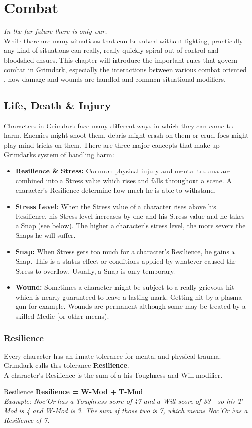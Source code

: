 \chapter{Combat}
\textit{In the far future there is only war.}\\
While there are many situations that can be solved without fighting, practically any kind of situations can really, really quickly spiral out of control and bloodshed ensues. 
This chapter will introduce the important rules that govern combat in Grimdark, especially the interactions between various combat oriented , how damage and wounds are handled and common situational modifiers.

\section{Life, Death \& Injury}
Characters in Grimdark face many different ways in which they can come to harm.
Enemies might shoot them, debris might crash on them or cruel foes might play mind tricks on them.
There are three major concepts that make up Grimdarks system of handling harm:
\begin{itemize}
	\item \textbf{Resilience \& Stress:} Common physical injury and mental trauma are combined into a Stress value which rises and falls throughout a scene. A character's Resilience determine how much he is able to withstand.
	\item \textbf{Stress Level:} When the Stress value of a character rises above his Resilience, his Stress level increases by one and his Stress value and he takes a Snap (see below). The higher a character's stress level, the more severe the Snaps he will suffer.
	\item \textbf{Snap:} When Stress gets too much for a character's Resilience, he gains a Snap. This is a status effect or conditions applied by whatever caused the Stress to overflow. Usually, a Snap is only temporary.
	\item \textbf{Wound:} Sometimes a character might be subject to a really grievous hit which is nearly guaranteed to leave a lasting mark. Getting hit by a plasma gun for example. Wounds are permanent although some may be treated by a skilled Medic (or other means).
\end{itemize}

\subsection{Resilience}\label{Resilience}
Every character has an innate tolerance for mental and physical trauma.
Grimdark calls this tolerance \textbf{Resilience}.\\
A character's Resilience is the sum of a his Toughness and Will modifier.
\begin{DndComment}{Resilience}
	\textbf{Resilience = W-Mod + T-Mod}\\
	\textit{Example: Noc'Or has a Toughness score of 47 and a Will score of 33 - so his T-Mod is 4 and W-Mod is 3. The sum of those two is 7, which means Noc'Or has a Resilience of 7.}
\end{DndComment}

